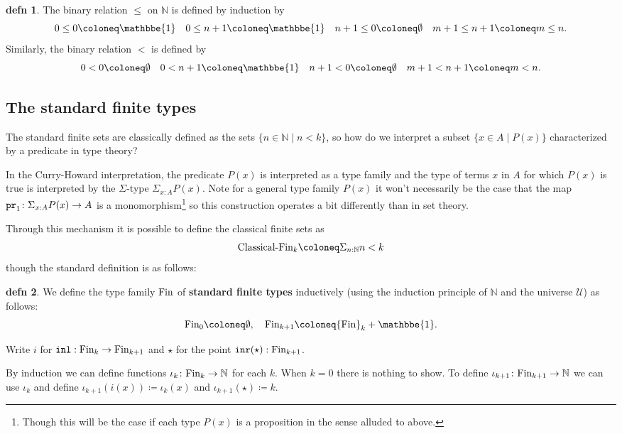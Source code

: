 \documentclass{amsart}
\theoremstyle{theorem}
\theoremstyle{definition}
\newtheorem*{defn}{defn}
\theoremstyle{remark}
\newcommand{\0}{\mathbbe{0}}
\newcommand{\1}{\mathbbe{1}}
\newcommand{\2}{\mathbbe{2}}
\newcommand{\3}{\mathbbe{3}}
\newcommand{\4}{\mathbbe{4}}
\newcommand{\term}[1]{{\textup{\texttt{#1}}}}
\newcommand{\type}[1]{{\textup{#1}}}
\newcommand{\bN}{{\mathbb{N}}}
\newcommand{\inl}{\term{inl}}
\newcommand{\inr}{\term{inr}}
\newcommand{\pr}{\term{pr}}
\newcommand{\UU}{{\mathcal{U}}}
\begin{document}
\begin{defn} The binary relation $\leq$ on $\bN$ is defined by induction by
  \[ 0 \leq 0 \coloneq \1 \quad 0 \leq n+1 \coloneq \1 \quad n+1 \leq 0 \coloneq \emptyset \quad m+1 \leq n+1 \coloneq m \leq n.\]
  Similarly, the binary relation $<$ is defined by
  \[ 0 < 0 \coloneq \emptyset \quad 0 < n+1 \coloneq \1 \quad n+1 < 0 \coloneq \emptyset \quad m+1 < n+1 \coloneq m < n.\]
  \end{defn}

\subsection*{The standard finite types}

The standard finite sets are classically defined as the sets $\{ n \in \bN \mid n < k\}$, so how do we interpret a subset $\{ x  \in A \mid P(x)\}$ characterized by a predicate in type theory?

In the Curry-Howard interpretation, the predicate $P(x)$ is interpreted as a type family and the type of terms $x$ in $A$ for which $P(x)$ is true is interpreted by the $\Sigma$-type $\Sigma_{x : A} P(x)$. Note for a general type family $P(x)$ it won't necessarily be the case that the map $\pr_1 \colon \Sigma_{x :A} P(x) \to A$ is a monomorphism\footnote{Though this will be the case if each type $P(x)$ is a proposition in the sense alluded to above.} so this construction operates a bit differently than in set theory.

Through this mechanism it is possible to define the classical finite sets as 
\[ \type{Classical-Fin}_k \coloneq \Sigma_{n : \bN}n < k \]
though the standard definition is as follows:

\begin{defn} We define the type family $\type{Fin}$ of \textbf{standard finite types} inductively (using the induction principle of $\bN$ and the universe $\UU$) as follows:
\[ \type{Fin}_0 \coloneq \emptyset, \quad \type{Fin}_{k+1} \coloneq \type{Fin}_k + \1.\]
\end{defn}

Write $i$ for $\inl : \type{Fin}_k \to \type{Fin}_{k+1}$ and $\star$ for the point $\inr(\star) : \type{Fin}_{k+1}$.

By induction we can define functions $\iota_k \colon \type{Fin}_k \to \bN$ for each $k$. When $k=0$ there is nothing to show. To define $\iota_{k+1} \colon \type{Fin}_{k+1} \to \bN$ we can use $\iota_k$  and define $\iota_{k+1}(i(x)) \coloneq \iota_k(x)$ and $\iota_{k+1}(\star)\coloneq k$.
\end{document}
